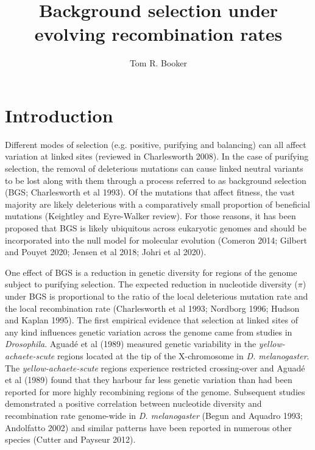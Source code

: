 \documentclass[10pt,twoside, twocolumn]{GSA_format}
\title{Background selection under evolving recombination rates}
\author[$\ast$]{Tom R. Booker}
\affil[$\ast$]{Department of Zoology, University of British Columbia}
\begin{document}
\maketitle

\marginmark

\firstpagefootnote


\vspace{-33pt}%

\section{Introduction}

Different modes of selection (e.g. positive, purifying and balancing) can all affect variation at linked sites (reviewed in Charlesworth 2008). In the case of purifying selection, the removal of deleterious mutations  can cause linked neutral variants to be lost along with them through a process referred to as background selection (BGS; Charlesworth et al 1993). Of the mutations that affect fitness, the vast majority are likely deleterious with a comparatively small proportion of beneficial mutations (Keightley and Eyre-Walker review). For those reasons, it has been proposed that BGS is likely ubiquitous across eukaryotic genomes and should be incorporated into the null model for molecular evolution (Comeron 2014; Gilbert and Pouyet 2020; Jensen et al 2018; Johri et al 2020).

\vspace{5px}

One effect of BGS is a reduction in genetic diversity for regions of the genome subject to purifying selection. The expected reduction in nucleotide diversity ($\pi$) under BGS is proportional to the ratio of the local deleterious mutation rate and the local recombination rate (Charlesworth et al 1993; Nordborg 1996; Hudson and Kaplan 1995). The first empirical evidence that selection at linked sites of any kind influences genetic variation across the genome came from studies in \textit{Drosophila}. Aguad\'e et al (1989) measured genetic variability in the \textit{yellow-achaete-scute} regions located at the tip of the X-chromosome in \textit{D. melanogaster}. The \textit{yellow-achaete-scute} regions experience restricted crossing-over and Aguad\'e et al (1989) found that they harbour far less genetic variation than had been reported for more highly recombining regions of the genome. Subsequent studies demonstrated a positive correlation between nucleotide diversity and recombination rate genome-wide in \textit{D. melanogaster} (Begun and Aquadro 1993; Andolfatto 2002) and similar patterns have been reported in numerous other species (Cutter and Payseur 2012). 
\end{document}
